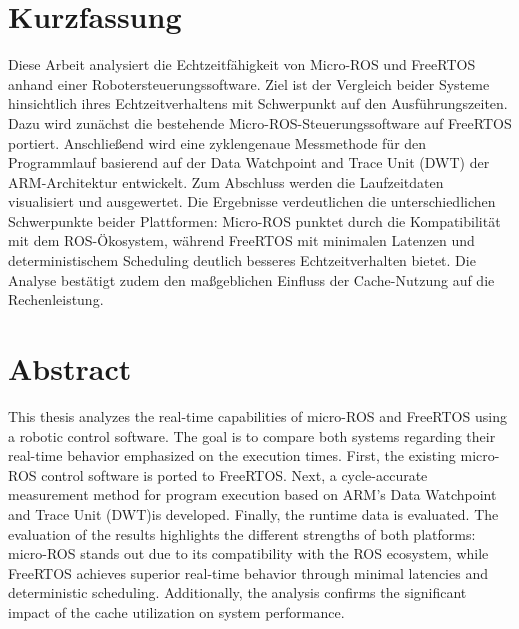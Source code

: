 \section*{Kurzfassung}

Diese Arbeit analysiert die Echtzeitfähigkeit von Micro-ROS und FreeRTOS anhand
einer Robotersteuerungssoftware. Ziel ist der Vergleich beider Systeme
hinsichtlich ihres Echtzeitverhaltens mit Schwerpunkt auf den Ausführungszeiten.
Dazu wird zunächst die bestehende Micro-ROS-Steuerungssoftware auf FreeRTOS
portiert. Anschließend wird eine zyklengenaue Messmethode für den Programmlauf
basierend auf der Data Watchpoint and Trace Unit (DWT) der ARM-Architektur
entwickelt. Zum Abschluss werden die Laufzeitdaten visualisiert und ausgewertet.
Die Ergebnisse verdeutlichen die unterschiedlichen Schwerpunkte beider
Plattformen: Micro-ROS punktet durch die Kompatibilität mit dem ROS-Ökosystem,
während FreeRTOS mit minimalen Latenzen und deterministischem Scheduling
deutlich besseres Echtzeitverhalten bietet. Die Analyse bestätigt zudem den
maßgeblichen Einfluss der Cache-Nutzung auf die Rechenleistung.

\section*{Abstract}

This thesis analyzes the real-time capabilities of micro-ROS and FreeRTOS using
a robotic control software. The goal is to compare both systems regarding their
real-time behavior emphasized on the execution times. First, the existing
micro-ROS control software is ported to FreeRTOS. Next, a cycle-accurate
measurement method for program execution based on ARM's Data Watchpoint and
Trace Unit (DWT)is developed. Finally, the runtime data is evaluated. The
evaluation of the results highlights the different strengths of both platforms:
micro-ROS stands out due to its compatibility with the ROS ecosystem, while
FreeRTOS achieves superior real-time behavior through minimal latencies and
deterministic scheduling. Additionally, the analysis confirms the significant
impact of the cache utilization on system performance.
